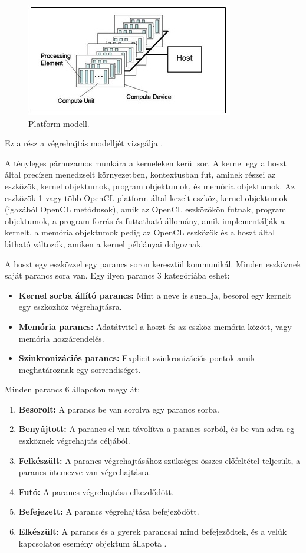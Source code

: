 \begin{figure}[h]
\centering
\includegraphics[scale=1.0]{images/platform_modell.jpg}
\caption{Platform modell. \cite{spec_platform}}
\label{fig:platform_modell}
\end{figure}

Ez a rész a végrehajtás modelljét vizsgálja \cite{spec_exec}.

A tényleges párhuzamos munkára a kerneleken kerül sor. A kernel egy a hoszt által precízen menedzselt környezetben, kontextusban fut, aminek részei az eszközök, kernel objektumok, program objektumok, és memória objektumok. Az eszközök 1 vagy több OpenCL platform által kezelt eszköz, kernel objektumok (igazából OpenCL metódusok), amik az OpenCL eszközökön futnak, program objektumok, a program forrás és futtatható állomány, amik implementálják a kernelt, a memória objektumok pedig az OpenCL eszközök és a hoszt által látható változók, amiken a kernel példányai dolgoznak.

A hoszt egy eszközzel egy parancs soron keresztül kommunikál. Minden eszköznek saját parancs sora van. Egy ilyen parancs 3 kategóriába eshet:
\begin{itemize}
\item\textbf{Kernel sorba állító parancs:} Mint a neve is sugallja, besorol egy kernelt egy eszközhöz végrehajtásra.
\item\textbf{Memória parancs:} Adatátvitel a hoszt és az eszköz memória között, vagy memória hozzárendelés.
\item\textbf{Szinkronizációs parancs:} Explicit szinkronizációs pontok amik meghatároznak egy sorrendiséget.
\end{itemize}
Minden parancs 6 állapoton megy át:
\begin{enumerate}
\item\textbf{Besorolt:} A parancs be van sorolva egy parancs sorba.
\item\textbf{Benyújtott:} A parancs el van távolítva a parancs sorból, és be van adva eg eszköznek végrehajtás céljából.
\item\textbf{Felkészült:} A parancs végrehajtásához szükséges összes előfeltétel teljesült, a parancs ütemezve van végrehajtásra.
\item\textbf{Futó:} A parancs végrehajtása elkezdődött.
\item\textbf{Befejezett:} A parancs végrehajtása befejeződött.
\item\textbf{Elkészült:} A parancs és a gyerek parancsai mind befejeződtek, és a velük kapcsolatos esemény objektum állapota .
\end{enumerate}


